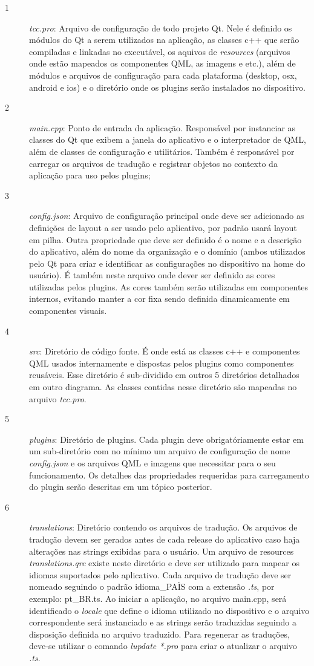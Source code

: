 \begin{description}
	\item[1] \textit{tcc.pro}: Arquivo de configuração de todo projeto Qt. Nele é definido os módulos do Qt a serem utilizados na aplicação, as classes c++ que serão compiladas e linkadas no executável, os aquivos de \textit{resources} (arquivos onde estão mapeados os componentes QML, as imagens e etc.), além de módulos e arquivos de configuração para cada plataforma (desktop, osx, android e ios) e o diretório onde os plugins serão instalados no dispositivo.
	\item[2] \textit{main.cpp}: Ponto de entrada da aplicação. Responsável por instanciar as classes do Qt que exibem a janela do aplicativo e o interpretador de QML, além de classes de configuração e utilitários. Também é responsável por carregar os arquivos de tradução e registrar objetos no contexto da aplicação para uso pelos plugins;
	\item[3] \textit{config.json}: Arquivo de configuração principal onde deve ser adicionado as definições de layout a ser usado pelo aplicativo, por padrão usará layout em pilha. Outra propriedade que deve ser definido é o nome e a descrição do aplicativo, além do nome da organização e o domínio (ambos utilizados pelo Qt para criar e identificar as configurações no dispositivo na home do usuário). É também neste arquivo onde dever ser definido as cores utilizadas pelos plugins. As cores também serão utilizadas em componentes internos, evitando manter a cor fixa sendo definida dinamicamente em componentes visuais.
	\item[4] \textit{src}: Diretório de código fonte. É onde está as classes c++ e componentes QML usados internamente e dispostas pelos plugins como componentes reusáveis. Esse diretório é sub-dividido em outros 5 diretórios detalhados em outro diagrama. As classes contidas nesse diretório são mapeadas no arquivo \textit{tcc.pro}.
	\item[5] \textit{plugins}: Diretório de plugins. Cada plugin deve obrigatóriamente estar em um sub-diretório com no mínimo um arquivo de configuração de nome \textit{config.json} e os arquivos QML e imagens que necessitar para o seu funcionamento. Os detalhes das propriedades requeridas para carregamento do plugin serão descritas em um tópico posterior.
	\item[6] \textit{translations}: Diretório contendo os arquivos de tradução. Os arquivos de tradução devem ser gerados antes de cada release do aplicativo caso haja alterações nas strings exibidas para o usuário. Um arquivo de resources \textit{translations.qrc} existe neste diretório e deve ser utilizado para mapear os idiomas suportados pelo aplicativo. Cada arquivo de tradução deve ser nomeado seguindo o padrão idioma_PAÌS com a extensão \textit{.ts}, por exemplo: pt_BR.ts. Ao iniciar a aplicação, no arquivo main.cpp, será identificado o \textit{locale} que define o idioma utilizado no dispositivo e o arquivo correspondente será instanciado e as strings serão traduzidas seguindo a disposição definida no arquivo traduzido. Para regenerar as traduções, deve-se utilizar o comando \textit{lupdate *.pro} para criar o atualizar o arquivo \textit{.ts}.

\end{description}
